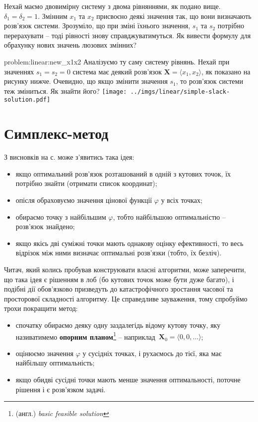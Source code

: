 \documentclass[\main/book.tex]{subfiles}
\begin{document}
\begin{question}
 Нехай маємо двовимірну систему з двома рівняннями, як подано вище. $\delta_1 = \delta_2 = 1$. Змінним $x_1$ та $x_2$ присвоєно деякі значення так, що вони визначають розв'язок системи. Зрозуміло, що при зміні їхнього значення, $s_1$ та $s_2$ потрібно перерахувати -- тоді рівності знову справджуватимуться. Як вивести формулу для обрахунку нових значень люзових змінних?
\end{question}

\begin{problem}{problem:linear:new_x1x2}
 Аналізуємо ту саму систему рівнянь. Нехай при значеннях $s_1 = s_2 = 0$ система має деякий розв'язок $\mathbf{X} = \langle x_1, x_2 \rangle$, як показано на рисунку нижче. Очевидно, що якщо змінити значення $s_1$, то розв'язок системи теж зміниться. Як знайти його?
 \center
 \texttt{[image: ../imgs/linear/simple-slack-solution.pdf]}
\end{problem}

\section{Симплекс-метод}
\label{section:linear:simplex}

З висновків на с. \pageref{conclusion:linear:optimal_solution} може з'явитись така ідея:

\begin{itemize}
 \item якщо оптимальний розв'язок розташований в одній з кутових точок, їх потрібно знайти (отримати список координат);
 \item опісля обраховуємо значення цінової функції $\varphi$ у всіх точках;
 \item обираємо точку з найбільшим $\varphi$, тобто найбільшою оптимальністю -- розв'язок знайдено;
 \item якщо якісь дві суміжні точки мають однакову оцінку ефективності, то весь відрізок між ними визначає оптимальні розв'язки (тобто, їх безліч).
\end{itemize}

Читач, який колись пробував конструювати власні алгоритми, може заперечити, що така ідея є рішенням \flqq{}в лоб\frqq{} (бо кутових точок може бути дуже багато), і подібні дії обов'язково призведуть до катастрофічного зростання часової та просторової складності алгоритму. Це справедливе зауваження, тому спробуймо трохи покращити метод:

\begin{itemize}
 \item спочатку обираємо деяку одну заздалегідь відому кутову точку, яку називатимемо \textbf{опорним планом}\footnote{(англ.) \textit{basic feasible solution}} -- наприклад~$\mathbf{X}_0 = {\langle 0, 0, \ldots \rangle}$;
 \item оцінюємо значення $\varphi$ у сусідніх точках, і рухаємось до тієї, яка має найбільшу оптимальність;
 \item якщо обидві сусідні точки мають менше значення оптимальності, поточне рішення і є розв'язком задачі.
\end{itemize}
\end{document}
